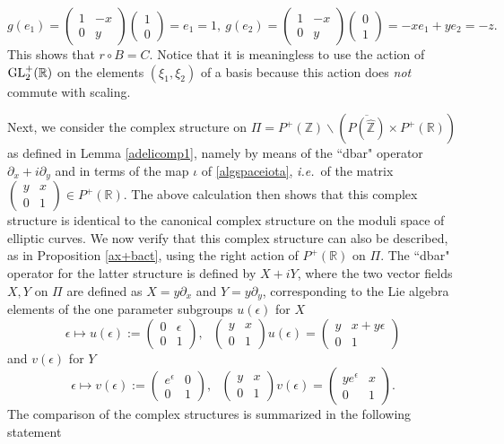 \documentclass[graybox, envcountsect%
]{svmult}
\def\GL{{\rm GL}}
\def\R{{\mathbb R}}
\def\Z{{\mathbb Z}}
\newcommand{\ie}{{\it i.e.\/}\ }
\begin{document}
$$g(e_1)=\begin{pmatrix} 1 &-x \\
0 &y
\end{pmatrix}\begin{pmatrix} 1  \\
0 
\end{pmatrix}=e_1=1, \ g(e_2)=\begin{pmatrix} 1 &-x \\
0 &y
\end{pmatrix}\begin{pmatrix} 0  \\
1 
\end{pmatrix}=-x e_1+ y e_2=-z.$$
This shows that $r\circ B=C$. Notice that it is meaningless to use the action of $\GL_2^+ (\R)$ on the elements $(\xi_1,\xi_2)$ of a basis because this action does \emph{not} commute with scaling. 

Next, we consider the complex  structure on $\Pi=P^+(\Z)\backslash (\overline{P(\hat \Z)}\times P^+(\R))$ as defined in Lemma \ref{adelicomp1}, namely by means of  the ``dbar" operator $\partial_x+i\partial_y$ and in terms of the map $\iota$ of \eqref{algspaceiota}, \ie  of the matrix $\begin{pmatrix} y &x \\
0 &1
\end{pmatrix} \in P^+ (\R)$. The above calculation then shows that this complex structure is identical to the canonical complex structure on the moduli space of elliptic curves. We now verify that this complex structure  can also be described, as in Proposition \ref{ax+bact}, using the right action of $P^+(\R)$ on $\Pi$.\newline
 The ``dbar" operator for the latter structure is defined by $X+iY$, where the two vector fields $X,Y$ on $\Pi$ are defined as $X=y\partial_x$ and $Y=y\partial_y$, corresponding to the Lie algebra elements of the one parameter subgroups $u(\epsilon)$ for $X$  
$$
\epsilon \mapsto u(\epsilon):=\begin{pmatrix} 0 &\epsilon \\
0 &1
\end{pmatrix}, \ \  \  \begin{pmatrix} y &x \\
0 &1
\end{pmatrix} u(\epsilon)= \begin{pmatrix} y &x+ y \epsilon \\
0 &1
\end{pmatrix} $$
and $v(\epsilon)$ for $Y$
$$\epsilon \mapsto v(\epsilon):=\begin{pmatrix} e^\epsilon &0 \\
0 &1
\end{pmatrix},\ \  \  \begin{pmatrix} y &x \\
0 &1
\end{pmatrix} v(\epsilon)= \begin{pmatrix} y e^\epsilon & x \\
0 &1
\end{pmatrix}.
$$
The comparison of the complex structures is summarized in the following statement
\end{document}
